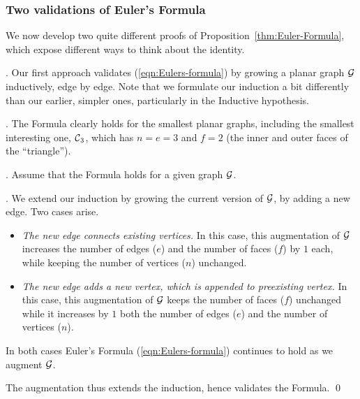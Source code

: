 \subsubsection{Two validations of Euler's Formula}
\label{subsec:validationEulerFormula}

We now develop two quite different proofs of Proposition~\ref{thm:Euler-Formula}, which expose different ways to think about the identity.

\medskip


. 
Our first approach validates (\ref{eqn:Eulers-formula}) by growing a planar graph $\mbox{$\cal G$}$
inductively, edge by edge.  Note that we formulate our induction a bit differently than our earlier, simpler ones, particularly in the Inductive hypothesis.

\smallskip

.
The Formula clearly holds for the smallest planar graphs, including the smallest interesting one, $\mbox{$\cal C$}_3$, which has $n = e = 3$ and $f =2$ (the inner and outer faces of the ``triangle'').

\smallskip

.
Assume that the Formula holds for a given graph $\mbox{$\cal G$}$.

\smallskip

.
We extend our induction by growing the current version of $\mbox{$\cal G$}$, by adding a new edge.  Two cases arise.
\begin{itemize}
\item
{\it The new edge connects existing vertices.}
In this case, this augmentation of $\mbox{$\cal G$}$ increases the number of edges ($e$) and the number of faces ($f$) by $1$ each, while keeping the number of vertices ($n$) unchanged.

\item
{\it The new edge adds a new vertex, which is appended to preexisting vertex.}
In this case, this augmentation of $\mbox{$\cal G$}$ keeps the number of faces ($f$) unchanged while
it increases by $1$ both the number of edges ($e$) and the number of vertices ($n$). 
\end{itemize}
In both cases Euler's Formula (\ref{eqn:Eulers-formula}) continues to hold as we augment $\mbox{$\cal G$}$.  

The augmentation thus extends the induction, hence validates the Formula.  \qed

